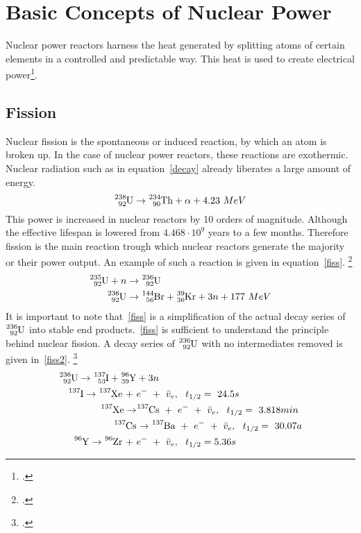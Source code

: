 \chapter{Basic Concepts of Nuclear Power}
Nuclear power reactors harness the heat generated by splitting atoms of certain
elements in a controlled and predictable way. This heat is used to create electrical power\footcite{WNPR}.
\section{Fission}
Nuclear fission is the spontaneous or induced reaction, by which an atom is broken up. In the
case of nuclear power reactors, these reactions are exothermic. Nuclear radiation such as in equation~\ref{decay}
already liberates a large amount of energy.
\begin{equation} \label{decay}
    \ce{^{238}_{92}U} \rightarrow \ce{^{234}_{90}Th} + \alpha + 4.23 ~MeV
\end{equation}
This power is increased in nuclear reactors by 10 orders of magnitude. Although the effective lifespan
is lowered from $4.468 \cdot 10^{9}$ years to a few months. Therefore fission is the main reaction
trough which nuclear reactors generate the majority or their power output. An example of such
a reaction is given in equation~\ref{fiss}. \footcite[286]{nucfundamentals}
\begin{equation} \label{fiss}
\begin{split}
    \ce{^{235}_{92}U} + n & \rightarrow \ce{^{236}_{92}U} \\
    \ce{^{236}_{92}U} & \rightarrow \ce{^{144}_{56}Br} + \ce{^{39}_{36}Kr} + 3n + 177 ~MeV
\end{split}
\end{equation}
It is important to note that~\ref{fiss} is a simplification of the actual decay series of $\ce{^{236}_{92}U}$ into
stable end products.~\ref{fiss} is sufficient to understand the principle behind nuclear fission.
A decay series of $\ce{^{236}_{92}U}$ with no intermediates removed is given in~\ref{fiss2}. \footcite[287]{nucfundamentals}
\begin{equation} \label{fiss2}
    \begin{split}
        \ce{^{236}_{92}U} \rightarrow \ce{^{137}_{53}I} + \ce{^{96}_{39}Y} & + 3n \\
            \ce{^{137}I} \rightarrow \ce{^{137}Xe} ~+~ & e^{-} ~+~ \bar{v}_{e}, ~~t_{1/2}=~24.5s \\
                \ce{^{137}Xe} \rightarrow & \ce{^{137}Cs} ~+~ e^{-} ~+~ \bar{v}_{e}, ~~t_{1/2}=~3.818min \\
                    \ce{^{137}Cs}& \rightarrow \ce{^{137}Ba} ~+~ e^{-} ~+~ \bar{v}_{e}, ~~t_{1/2}=~30.07a \\
            \ce{^{96}Y} \rightarrow \ce{^{96}Zr} ~+~ & e^{-} ~+~ \bar{v}_{e}, ~~t_{1/2}=5.36s 
    \end{split}
\end{equation}

